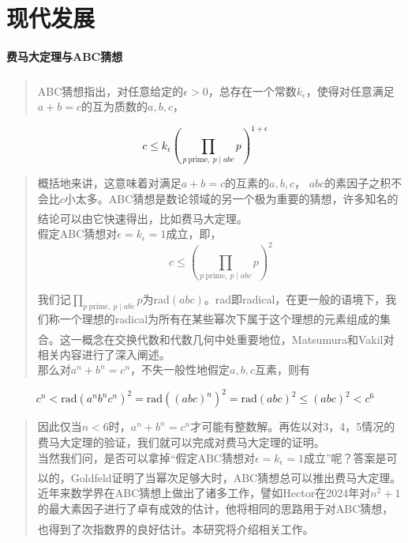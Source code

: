 \documentclass{article}
\newcommand{\upcite}[1]{\textsuperscript{\textsuperscript{\cite{#1}}}}
\begin{document}
\section{现代发展}

\paragraph{费马大定理与ABC猜想} 
\begin{quote}
ABC猜想指出\upcite{ref11}，对任意给定的$\epsilon > 0$，总存在一个常数$k_\epsilon$，使得对任意满足$a+b=c$的互为质数的$a,b,c$，
\end{quote}
$$
c \leq k_\epsilon \left(\prod_{p \ \text{prime}, \ p \mid abc} p\right)^{1+\epsilon}
$$

\begin{quote}
概括地来讲，这意味着对满足$a+b=c$的互素的$a, b, c$， $abc$的素因子之积不会比$c$小太多。ABC猜想是数论领域的另一个极为重要的猜想，许多知名的结论可以由它快速得出，比如费马大定理\upcite{ref11}。\\

假定ABC猜想对$\epsilon = k_\epsilon = 1$成立，即，
$$
c \leq \left(\prod_{p \ \text{prime}, \ p \mid abc} p\right)^2
$$

我们记$\prod_{p \ \text{prime}, \ p \mid abc} p$为rad$(abc)$。rad即radical，在更一般的语境下，我们称一个理想的radical为所有在某些幂次下属于这个理想的元素组成的集合。这一概念在交换代数和代数几何中处重要地位，Matsumura\upcite{ref5}和Vakil\upcite{ref7}对相关内容进行了深入阐述。\\

那么对$a^n + b^n = c^n$，不失一般性地假定$a, b, c$互素，则有
\end{quote}
$$
c^n < \text{rad}(a^n b^n c^n)^2 = \text{rad}((abc)^n)^2 = \text{rad}(abc)^2 \leq (abc)^2 < c^6
$$
\begin{quote}
因此仅当$n < 6$时，$a^n + b^n = c^n$才可能有整数解。再佐以对3，4，5情况的费马大定理的验证，我们就可以完成对费马大定理的证明。\\

当然我们问，是否可以拿掉“假定ABC猜想对$\epsilon = k_\epsilon = 1$成立”呢？答案是可以的，Goldfeld证明了当幂次足够大时，ABC猜想总可以推出费马大定理\upcite{ref15}。\\

近年来数学界在ABC猜想上做出了诸多工作，譬如Hector在2024年对$n^2 + 1$的最大素因子进行了卓有成效的估计，他将相同的思路用于对ABC猜想，也得到了次指数界的良好估计\upcite{ref8}。本研究将介绍相关工作。
\end{quote}
\end{document}
